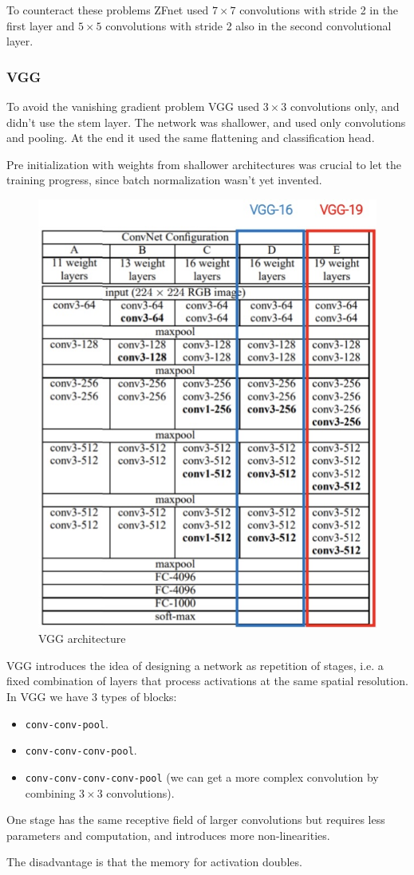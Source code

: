 \documentclass{article}
\begin{document}
To counteract these problems ZFnet used $7\times 7$ convolutions with stride 2 in the first layer and $5\times 5$ convolutions with stride 2 also in the second convolutional layer.

\subsubsection{VGG}
To avoid the vanishing gradient problem VGG used $3 \times 3$ convolutions only, and didn't use the stem layer.
The network was shallower, and used only convolutions and pooling.
At the end it used the same flattening and classification head.

Pre initialization with weights from shallower architectures was crucial to let the training progress, since batch normalization wasn't yet invented.

\begin{figure}[htbp]
  \centering
  \includegraphics[width=0.35\linewidth]{./img/vgg.jpg}
  \caption{VGG architecture}
\end{figure}

VGG introduces the idea of designing a network as repetition of stages, i.e. a fixed combination of layers that process activations at the same spatial resolution.
In VGG we have 3 types of blocks:
\begin{itemize}
  \item \verb|conv-conv-pool|.
  \item \verb|conv-conv-conv-pool|.
  \item \verb|conv-conv-conv-conv-pool| (we can get a more complex convolution by combining $3\times 3$ convolutions).
\end{itemize}

One stage has the same receptive field of larger convolutions but requires less parameters and computation, and introduces more non-linearities.

The disadvantage is that the memory for activation doubles.
\end{document}
